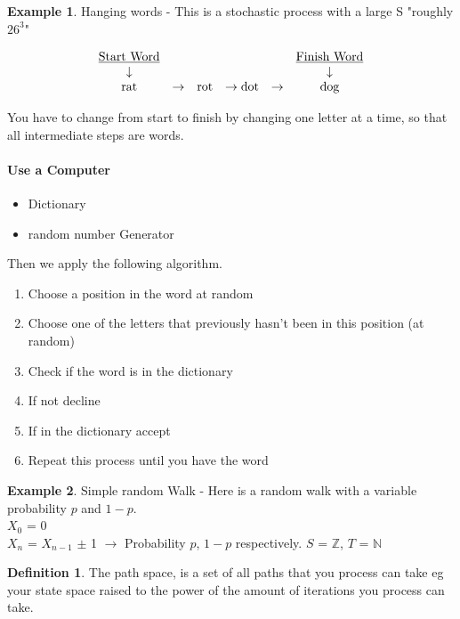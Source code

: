 \documentclass{article}
\theoremstyle{definition}
\newtheorem*{defn}{Definition}
\newtheorem*{ex}{Example}
\begin{document}
\begin{ex}
Hanging words - This is a stochastic process with a large S "roughly $26^3$"

\[
\begin{array}{ccccccc}
\mbox{\underline{Start Word}} & & & & & \mbox{\underline{Finish Word}} \\
\downarrow & & & & & \downarrow \\
\mbox{rat} & \rightarrow & \mbox{rot} & \rightarrow \mbox{dot} & \rightarrow & \mbox{dog}
\end{array}
\]

You have to change from start to finish by changing one letter at a time, so that all intermediate steps are words.
\end{ex}

\paragraph*{Use a Computer}

\begin{itemize}
\item
Dictionary
\item
random number Generator
\end{itemize}

Then we apply the following algorithm.

\begin{enumerate}
\item
Choose a position in the word at random
\item
Choose one of the letters that previously hasn't been in this position (at random)
\item
Check if the word is in the dictionary
\item
If not decline
\item
If in the dictionary accept
\item
Repeat this process until you have the word
\end{enumerate}

\begin{ex}Simple random Walk - Here is a random walk with a variable probability $p$ and $1-p$.\\

$X_0$ = 0\\
$X_n$ = $X_{n-1}$ $\pm$ 1 $\rightarrow$ Probability $p$, $1-p$ respectively.
\indent $S$ = $\mathbb{Z}$, $T$ = $\mathbb{N}$
\end{ex}

\begin{defn} The path space, is a set of all paths that you process can take eg your state space raised to the power of the amount of iterations you process can take.
\end{defn}
\end{document}
